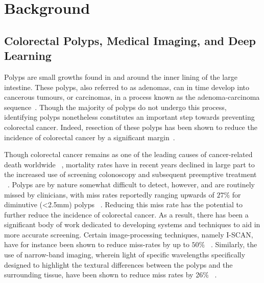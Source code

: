 \chapter{Background} \label{background}
% 
\section{Colorectal Polyps, Medical Imaging, and Deep Learning}

	Polyps are small growths found in and around the inner lining of the large intestine. These polyps, also referred to as adenomas, can in time develop into cancerous tumours, or carcinomas, in a process known as the adenoma-carcinoma sequence~\cite{ACS}. Though the majority of polyps do not undergo this process, identifying polyps nonetheless constitutes an important step towards preventing colorectal cancer. Indeed, resection of these polyps has been shown to reduce the incidence of colorectal cancer by a significant margin~\cite{resection}. 
	
	Though colorectal cancer remains as one of the leading causes of cancer-related death worldwide ~\cite{colorectal_cancer}, mortality rates have in recent years declined in large part to the increased use of screening colonoscopy and subsequent preemptive treatment ~\cite{screening}. Polyps are by nature somewhat difficult to detect, however, and are routinely missed by clinicians, with miss rates reportedly ranging upwards of $27\%$ for diminutive (<2.5mm) polyps ~\cite{missrate1, missrate2}.
	Reducing this miss rate has the potential to further reduce the incidence of colorectal cancer. As a result, there has been a significant body of work dedicated to developing systems and techniques to aid in more accurate screening. Certain image-processing techniques, namely I-SCAN, have for instance been shown to reduce miss-rates by up to $50\%$ ~\cite{i-scan}. Similarly, the use of narrow-band imaging, wherein light of specific wavelengths specifically designed to highlight the textural differences between the polyps and the surrounding tissue, have been shown to reduce miss rates by 26\% ~\cite{nbi}. 
	
